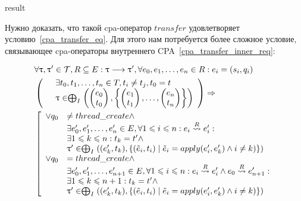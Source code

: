 \begin{enumerate}
\begin{algorithm}
  \Return result

 \caption{$transfer_{TM}(e_0, \pi_0, reached)$}
 \label{cpata_transfer}
\end{algorithm}

Нужно доказать, что такой cpa-оператор $transfer$ удовлетворяет условию~\ref{cpa_transfer_eq}.
Для этого нам потребуется более сложное условие, связывающее cpa-операторы внутреннего CPA~\ref{cpa_transfer_inner_req}:

\begin{equation}
\begin{aligned}
\label{cpa_transfer_inner_req}
& \forall \uptau, \uptau' \in \mathcal{T}, R \subseteq E: \uptau \longrightarrow \uptau', \forall e_0, e_1, \dots, e_n \in R: e_i = (s_i, q_i) \\
& \left(
\begin{array}{ll}
& \exists t_0, t_1, \dots, t_n \in T, t_i \neq t_j, t_0 = t \\
& \uptau \in \mathrel{\bigoplus}_I
\left(
\begin{pmatrix}
e_0 \\
t_0 
\end{pmatrix},
\left\{
\begin{pmatrix}
e_1 \\
t_1 
\end{pmatrix} ,
\dots ,
\begin{pmatrix}
e_n \\
t_n 
\end{pmatrix}
\right\}
\right)
\end{array}
\right) \Rightarrow \\
& \left[ \begin{array}{ll}
\lor q_0 & \neq thread\_create \land \\
& \exists e'_0, e'_1, \dots, e'_n \in E, \forall 1 \leqslant i \leqslant n: e_i \stackrel{R}{\leadsto} e'_i: \\
& \exists 1 \leqslant k \leqslant n: t_k = t' \land \\
& \uptau' \in \mathrel{\bigoplus}_I((e_k', t_k), \{(\tilde{e}_i, t_i) \mid \tilde{e}_i = apply(e_i', e'_k) \land i \neq k)\}) \\
\lor q_0 & = thread\_create \land \\
& \exists e'_0, e'_1, \dots, e'_{n+1} \in E, \forall 1 \leqslant i \leqslant n: e_i \stackrel{R}{\leadsto} e'_i \land e_0 \stackrel{R}{\leadsto} e'_{n+1}: \\
& \exists 1 \leqslant k \leqslant n + 1: t_k = t' \land \\
& \uptau' \in \mathrel{\bigoplus}_I((e_k', t_k), \{(\tilde{e}_i, t_i) \mid \tilde{e}_i = apply(e_i', e'_k) \land i \neq k)\}) 
\end{array} 
\right.
\end{aligned}
\end{equation}


\end{enumerate}
